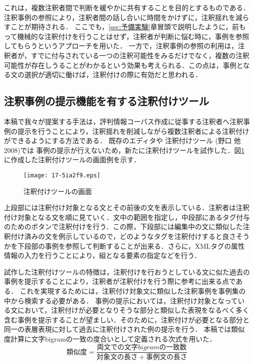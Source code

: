\documentclass[japanese]{jnlp_1.4}
\begin{document}
これは，複数注釈者間で判断を緩やかに共有することを目的とするものである．注釈事例の参照により，注釈者間の話し合いに時間をかけずに，注釈揺れを減らすことが期待される．
ここでも，\ref{sec:予備実験}章冒頭で説明したように，前もって機械的な注釈付けを行うことはせず，注釈者が判断に悩む時に，事例を参照してもらうというアプローチを用いた．
一方で，注釈事例の参照の利用は，注釈者が，すでに付与されている一つの注釈可能性をみるだけでなく，複数の注釈可能性が存在しうることがわかるという効果も考えられる．この点は，事例となる文の選択が適切に働けば，注釈付けの際に有効だと思われる．



\subsection{注釈事例の提示機能を有する注釈付けツール}
\label{sec:注釈事例の提示機能を有する注釈付けツール}

本稿で我々が提案する手法は，評判情報コーパス作成に従事する注釈者へ注釈事例の提示を行うことにより，注釈揺れを削減しながら複数注釈者による注釈付けができるようにする方法である．
既存のエディタや
    注釈付けツール (野口 他 2008)\nocite{Noguchi08}では
事例の提示が行えないため，新たに注釈付けツールを試作した．図\ref{fig:注釈付けツールの画面}に作成した注釈付けツールの画面例を示す．

\begin{figure}[b]
\texttt{[image: 17-5ia2f9.eps]}
\caption{注釈付けツールの画面}
\label{fig:注釈付けツールの画面}
\end{figure}

上段部には注釈付け対象となる文とその前後の文を表示している．注釈者は注釈付け対象となる文を順に見ていく．文中の範囲を指定し，中段部にあるタグ付与のためのボタンで注釈付けを行う．この際，下段部には編集中の文に類似した注釈付け済みの文を例示しているので，どのようなタグを注釈付けすると良さそうかを下段部の事例を参照して判断することが出来る．さらに，XMLタグの属性情報の入力を行うことにより，組となる要素の指定などを行う．

試作した注釈付けツールの特徴は，注釈付けを行おうとしている文に似た過去の事例を提示することにより，注釈者が注釈付けを行う際に参考に出来る点である．
これを実現するためには，注釈付け対象文に類似した注釈事例を事例集の中から検索する必要がある．
事例の提示においては，注釈付け対象となっている文において，注釈付けが必要となりそうな部分と類似した表現をなるべく多く含む事例を提示することが望ましい．そのために，注釈付けが必要となる部分と同一の表層表現に対して過去に注釈付けされた例の提示を行う．
本稿では類似度計算に文字bigramの一致の度合いとして定義される次式を用いた．
\begin{equation}
類似度=\frac{両文での文字bigramの一致数}{対象文の長さ+事例文の長さ}
\end{equation}
\end{document}

